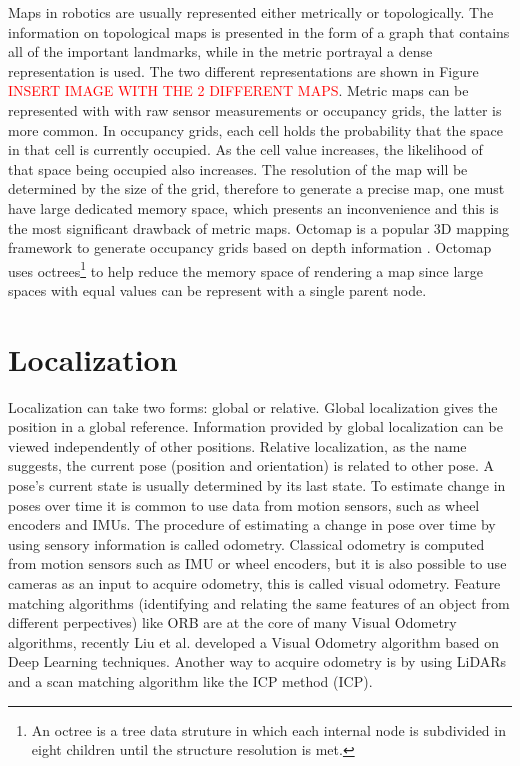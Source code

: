 Maps in robotics are usually represented either metrically or topologically. The information on topological maps is presented in the form of a graph that contains all of the important landmarks, while in the metric portrayal a dense representation is used. The two different representations are shown in Figure \textcolor{red}{INSERT IMAGE WITH THE 2 DIFFERENT MAPS}. Metric maps can be represented with with raw sensor measurements or occupancy grids, the latter is more common. In occupancy grids, each cell holds the probability that the space in that cell is currently occupied. As the cell value increases, the likelihood of that space being occupied also increases. The resolution of the map will be determined by the size of the grid, therefore to generate a precise map, one must have large dedicated memory space, which presents an inconvenience and this is the most significant drawback of metric maps. Octomap is a popular 3D mapping framework to generate occupancy grids based on depth information \cite{hornung_octomap_2013}. Octomap uses octrees\footnote{An octree is a tree data struture in which each internal node is subdivided in eight children until the structure resolution is met.} to help reduce the memory space of rendering a map since large spaces with equal values can be represent with a single parent node.

\section{Localization}
Localization can take two forms: global or relative. Global localization gives the position in a global reference. Information provided by global localization can be viewed independently of other positions.
Relative localization, as the name suggests, the current pose (position and orientation) is related to other pose. A pose's current state is usually determined by its last state. To estimate change in poses over time it is common to use data from motion sensors, such as wheel encoders and \acs*{IMU}s. The procedure of estimating a change in pose over time by using sensory information is called odometry. Classical odometry is computed from motion sensors such as \acs*{IMU} or wheel encoders, but it is also possible to use cameras as an input to acquire odometry, this is called visual odometry. Feature matching algorithms (identifying and relating the same features of an object from different perpectives) like ORB \cite{rublee_orb_2011} are at the core of many Visual Odometry algorithms, recently Liu et al. \cite{liu_visual_2021} developed a Visual Odometry algorithm based on Deep Learning techniques. Another way to acquire odometry is by using \acs*{LiDAR}s and a scan matching algorithm like the \acl*{ICP} method (\acs*{ICP}).

